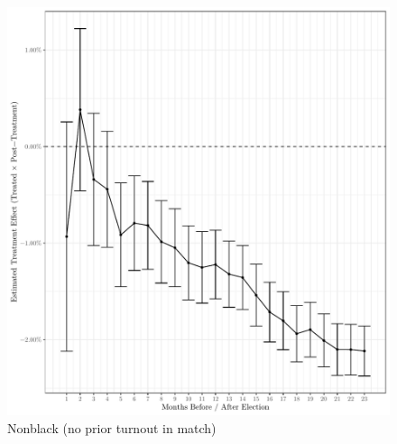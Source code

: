 \documentclass[
  12pt,
]{article}
\begin{document}
\begin{figure}[H]

{\centering \includegraphics{compile_files/figure-latex/non-black-no-prior-1} 

}

\caption{\label{fig:did-1}Nonblack (no prior turnout in match)}\label{fig:non-black-no-prior}
\end{figure}
\end{document}
